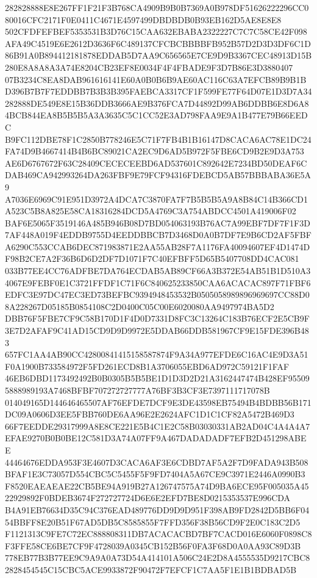 \documentclass[UTF8,fontset=fandol,zihao=-4,a4paper]{ctexart}
\begin{document}
{{282828888E8E267FF1F21F3B768CA4909B9B0B7369A0B978DF51626222296CC080016CFC2171F0E0411C4671E4597499DBDBDB0B93EB162D5AE8E8E8
502CFDFEFBEF5353531B3D76C15CAA632EBABA2322227C7C7C58CE42F098AFA49C4519E6E2612D3636F6C489137CFCBCBBBBFB952B57D2D3D3DF6C1D
86B91A0B894412181878EDDAB5D7AA9C656565E7CE9D9B3367CEC48913D15B280E8A8A8A3A74E8204CB23EF8E0034F4F4FBADE9F3D7B86E3D3880407
07B3234C8EA8DAB961616141E60A0B0B6B9AE60AC116C63A7EFCB89B9B1BD396B7B7F7EDDBB7B3B3B395FAEBCA3317CF1F599FE77F64D07E1D3D7A34
282888DE549E8E15B36DDB3666AE9B376FCA7D44892D99AB6DDBB6E8D6A84BCB844EA8B5B5B5A3A3635C5C1CC52E3AD798FAA9E9A1B477E79B66EEDC
B9FC112DBE78F1C2850B778246E5C71F7FB4B1B16147D8CACA6AC78E1DC24FA74D9B4667414B4B6BC89021CA2EC9D6AD5B972F5FBE6CD9B2E9D3A753
AE6D6767672F63C28409CECECEEBD6AD537601C892642E7234BD50DEAF6CDAB469CA942993264DA263FBF9E79FCF94316FDEBCD5AB57BBBABA36E5A9
A7036E6969C91E951D3972A4DCA7C3870FA7F7B5B5B5A9A8B84C14B366CD1A523C5B8A825E58CA18316284DCD5A4769C3A754ABDCC4501A419006F02
BAF6E5065F3519146A485B946B08D7BD054063193B76AC7A99EBF7DF7F1F3D7AF448A019F4EDDB9755D4EEDDBBCB7D3468D0A0B7DF7E9B6CD2AF5FBF
A6290C553CCAB6DEC871983871E2AA55AB28F7A1176FA40094607EF4D1474DF98B2CE7A2F36B6D6D2DF7D1071F7C40EFBFF5D65B5407708DD4CAC081
033B77EE4CC76ADFBE7DA764ECDAB5AB89CF66A3B372E54AB51B1D510A34067E9FEBF0E1C3721FFDF1C71F6C840625233850CAA6ACACAC897F71FBF6
EDFC3E97DC47EC3ED73BEFBC9394948453532B0505058989896969697CC88D08A228267D05185B0854108C2D0400C05C00E6020080AA9497974BA5D2
DBB76F5FBE7CF9C58B170D1F4D0D7331D8FC3C13264C183B76ECF2E5CB9F3E7D2AFAF9C41AD15CD9D9D9972E5DDAB66DDB581967CF9E15FDE396B483
657FC1AA4AB90CC42800841415158587874F9A34A977EFDE6C16AC4E9D3A51F0A1900B733584972F5FD261ECD8B1A3706055EBD6AD972C59121F1FAF
46EB6DBD1173492492B0B0305B5B5BE1D1D3D2D21A3162447474B428EF955095888989193A7468BFBF707272727777A76BF3B3CF3E7397111717078B
014049165D144646465507AF76EFDE7DCF9E3DE43598EB75494B4BDBB56B171DC09A0606D3EE5FBB760DE6AA96E2E2624AFC1D1C1CF82A5472B469D3
66F7EEDDE29317999A8E8CE221E5B4C1E2C58B03030331AB2AD04C4A4A4A7EFAE9270B0B0BE12C581D3A74A07FF9A467DADADADF7EFB2D451298ABEE
44464676EDDA953F3E4607D3CACA6AF3E6CDBD7AF5A2F7D9FADA943B508BFAF1E3C73057D554CBC5C5455F5F9FD7404A5A67CE9C3971E2446A0990B3
F8520EAEAEAE22CB5BE94A919B27A126747575A74D9BA6ECE95F005035A4522929892F0BDEB3674F272727724D6E6E2EFD7BE8D0215353537E996CDA
B4A91EB76634D35C94C376EAD489776DD9D9D951F398AB9FD2842D5BB6F0454BBFF8E20B51F67AD5DB5C8585855F7FFD356F38B56CD9F2E0C183C2D5
F1121313C9FE7C72EC888808311DB7ACACACBD7BF7CACD016E6060F0898C8F3FFE58CE6BE7CF9F4728039A0345CB152B56F0FA3F68D0A0AA93C89D3B
778EB77B3B77EE9C9A9A0A73D54A414101A506C24E2D8A4555535D9217CBC82828454545C15CBC5ACE9933872F90472F7EFCF1C7AA5F1E1B1BDBAD5B
}}
\end{document}
